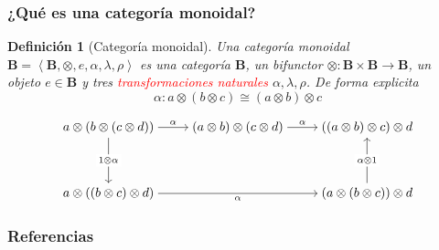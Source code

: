 \documentclass[10pt, aspectratio = 43,usenames,dvipsnames]{beamer}
\newtheorem{definicion}{Definición}
\begin{document}
	\begin{frame}[t]
		\frametitle{¿Qué es una categoría monoidal?}
		\begin{definicion}[Categoría monoidal]
			Una categoría monoidal $\mathbf{B} = \left\langle \mathbf{B}, \otimes, e, \alpha, \lambda, \rho\right\rangle$ es una categoría $\mathbf{B}$, un bifunctor $\otimes: \mathbf{B}\times\mathbf{B}\to\mathbf{B}$, un objeto $e\in\mathbf{B}$ y tres \textcolor{red}{transformaciones naturales} $\alpha, \lambda, \rho$. De forma explicita
			\begin{equation*}
				\alpha: a\otimes(b\otimes c)\cong(a\otimes b)\otimes c
			\end{equation*}
			
			\[\begin{tikzcd}[ampersand replacement=\&,cramped,column sep=small]
				{a\otimes(b\otimes(c\otimes d))} \&\& {(a\otimes b)\otimes(c\otimes d)} \&\& {((a\otimes b)\otimes c)\otimes d} \\
				\\
				{a\otimes((b\otimes c)\otimes d)} \&\&\&\& {(a\otimes(b\otimes c))\otimes d}
				\arrow["\alpha", from=1-1, to=1-3]
				\arrow["{1\otimes \alpha}"{description}, from=1-1, to=3-1]
				\arrow["\alpha", from=1-3, to=1-5]
				\arrow["\alpha"', from=3-1, to=3-5]
				\arrow["{\alpha\otimes 1}"{description}, from=3-5, to=1-5]
			\end{tikzcd}\]
		\end{definicion}
	\end{frame}
	
	\nocite{*}
	\begin{frame}[t, allowframebreaks]
		\frametitle{Referencias}
		
		
	\end{frame}
\end{document}
